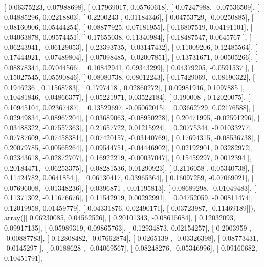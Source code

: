 \documentclass{article}
\begin{document}
       [ 0.06375223,  0.07988698],
       [ 0.17969017,  0.05760618],
       [ 0.07247988, -0.07536509],
       [ 0.04885296,  0.02218803],
       [ 0.2200243 ,  0.01184346],
       [ 0.04753729, -0.00250885],
       [ 0.08160906,  0.05444254],
       [ 0.08877925,  0.07181955],
       [ 0.16807519,  0.04191101],
       [ 0.04063878,  0.09574451],
       [ 0.17655038,  0.11340984],
       [ 0.18487547,  0.0645767 ],
       [ 0.06243941, -0.06129053],
       [ 0.23393735, -0.03147432],
       [ 0.11009206,  0.12485564],
       [ 0.17444921, -0.07489804],
       [ 0.07098485, -0.02007851],
       [ 0.13731671,  0.00505266],
       [ 0.08878344,  0.07044566],
       [ 0.10842941,  0.09343299],
       [ 0.04379205, -0.0591537 ],
       [ 0.15027545,  0.05590846],
       [ 0.08080738,  0.08012243],
       [ 0.17429069, -0.08190322],
       [ 0.1946236 ,  0.11568783],
       [ 0.1797418 ,  0.02860272],
       [ 0.09981946,  0.1097885 ],
       [ 0.10481846, -0.04866377],
       [ 0.05221971,  0.03522184],
       [ 0.190008  ,  0.12020075],
       [ 0.10945104,  0.02367487],
       [ 0.13529697, -0.05062015],
       [ 0.03662729,  0.02176588],
       [ 0.02949834, -0.08967204],
       [ 0.03689063, -0.08950228],
       [ 0.20471995, -0.02591296],
       [ 0.03488322, -0.07557363],
       [ 0.21657722,  0.01215924],
       [ 0.20775344, -0.01033277],
       [ 0.07787609, -0.07458381],
       [ 0.07420157, -0.03140769],
       [ 0.17694315, -0.08536738],
       [ 0.20079785, -0.00565264],
       [ 0.09544751, -0.04446902],
       [ 0.02192901,  0.03282972],
       [ 0.02343618, -0.02872707],
       [ 0.16922219, -0.00037047],
       [ 0.15459297,  0.0012394 ],
       [ 0.20184471, -0.06253375],
       [ 0.08281536,  0.01290923],
       [ 0.2116058 ,  0.05340738],
       [ 0.11424782,  0.0641854 ],
       [ 0.06130417,  0.03965364],
       [ 0.16097259, -0.07069021],
       [ 0.07696008, -0.01348236],
       [ 0.0396871 ,  0.01195813],
       [ 0.08689298, -0.01049483],
       [ 0.11371302, -0.11676676],
       [ 0.11542919,  0.00292991],
       [ 0.04752059, -0.00811474],
       [ 0.12019958,  0.01459779],
       [ 0.04331876,  0.02490171],
       [ 0.03723987, -0.11469189]]), array([[ 0.06230085,  0.04562526],
       [ 0.20101343, -0.08615684],
       [ 0.12032093,  0.09917135],
       [ 0.05989319,  0.09865763],
       [ 0.12934873,  0.02154257],
       [ 0.2003959 , -0.00887783],
       [ 0.12808482, -0.07662874],
       [ 0.0265139 , -0.03326398],
       [ 0.08773431, -0.0145297 ],
       [ 0.0188628 , -0.04069567],
       [ 0.08248276, -0.05346996],
       [ 0.09160682,  0.10451791],
\end{document}
